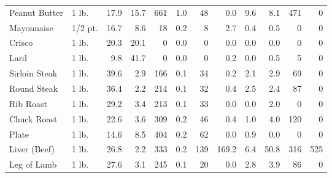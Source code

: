 \documentclass[
  ignorenonframetext,
]{beamer}
\begin{document}
\begin{frame}[fragile]
\begin{tabular}{llrrrrrrrrrr}
Peanut Butter           &       1 lb. &                17.9 &      15.7 &          661 &          1.0 &         48 &             0.0 &            9.6 &              8.1 &          471 &                   0 \\
Mayonnaise              &     1/2 pt. &                16.7 &       8.6 &           18 &          0.2 &          8 &             2.7 &            0.4 &              0.5 &            0 &                   0 \\
Crisco                  &       1 lb. &                20.3 &      20.1 &            0 &          0.0 &          0 &             0.0 &            0.0 &              0.0 &            0 &                   0 \\
Lard                    &       1 lb. &                 9.8 &      41.7 &            0 &          0.0 &          0 &             0.2 &            0.0 &              0.5 &            5 &                   0 \\
Sirloin Steak           &       1 lb. &                39.6 &       2.9 &          166 &          0.1 &         34 &             0.2 &            2.1 &              2.9 &           69 &                   0 \\
Round Steak             &       1 lb. &                36.4 &       2.2 &          214 &          0.1 &         32 &             0.4 &            2.5 &              2.4 &           87 &                   0 \\
Rib Roast               &       1 lb. &                29.2 &       3.4 &          213 &          0.1 &         33 &             0.0 &            0.0 &              2.0 &            0 &                   0 \\
Chuck Roast             &       1 lb. &                22.6 &       3.6 &          309 &          0.2 &         46 &             0.4 &            1.0 &              4.0 &          120 &                   0 \\
Plate                   &       1 lb. &                14.6 &       8.5 &          404 &          0.2 &         62 &             0.0 &            0.9 &              0.0 &            0 &                   0 \\
Liver (Beef)            &       1 lb. &                26.8 &       2.2 &          333 &          0.2 &        139 &           169.2 &            6.4 &             50.8 &          316 &                 525 \\
Leg of Lamb             &       1 lb. &                27.6 &       3.1 &          245 &          0.1 &         20 &             0.0 &            2.8 &              3.9 &           86 &                   0 \\

\end{tabular}
\end{frame}
\end{document}
